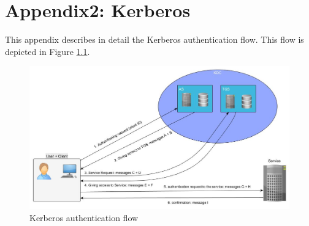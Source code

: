 \chapter{Appendix2: Kerberos}
\label{appendix:kerberos}
This appendix describes in detail the Kerberos authentication flow. This flow is depicted in Figure \ref{fig:kerberos}.

\begin{figure}[!ht]
	\centering
	\caption{Kerberos authentication flow}
	\label{fig:kerberos}
	\includegraphics[scale=0.4]{images/kerberos}
\end{figure}

